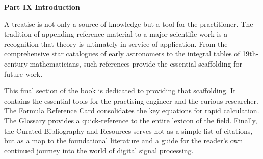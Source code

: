 \newpage
\thispagestyle{empty}

\vspace*{3cm}

\begin{center}
{\Large\lorettadisplay\bfseries Part IX Introduction}
\end{center}

\vspace{2cm}

A treatise is not only a source of knowledge but a tool for the practitioner. The tradition of appending reference material to a major scientific work is a recognition that theory is ultimately in service of application. From the comprehensive star catalogues of early astronomers to the integral tables of 19th-century mathematicians, such references provide the essential scaffolding for future work.

\vspace{1em}

This final section of the book is dedicated to providing that scaffolding. It contains the essential tools for the practising engineer and the curious researcher. The Formula Reference Card consolidates the key equations for rapid calculation. The Glossary provides a quick-reference to the entire lexicon of the field. Finally, the Curated Bibliography and Resources serves not as a simple list of citations, but as a map to the foundational literature and a guide for the reader's own continued journey into the world of digital signal processing.

\vspace*{\fill}
\newpage
